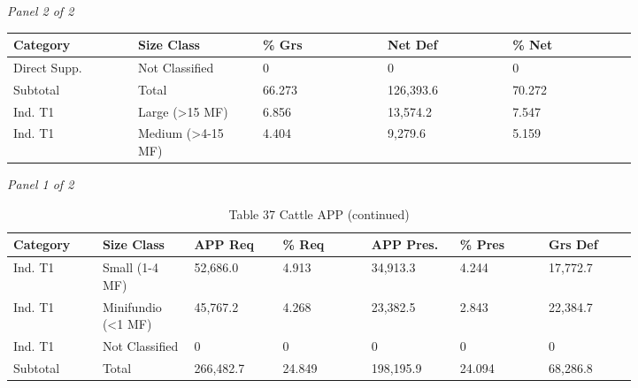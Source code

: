 \documentclass[12pt]{article}
\begin{document}
\begin{landscape}
\begin{table}[H]
\textit{Panel 2 of 2}\\[2pt]
{\fontsize{12}{14}\selectfont
\setlength{\tabcolsep}{3pt}
\renewcommand{\arraystretch}{1.08}
\begin{tabular}{p{0.164\linewidth}p{0.164\linewidth}p{0.164\linewidth}p{0.164\linewidth}p{0.164\linewidth}}
\toprule
Category & Size Class & \% Grs & Net Def & \% Net \\
\midrule
Direct Supp. & Not Classified & 0 & 0 & 0 \\
Subtotal & Total & 66.273 & 126,393.6 & 70.272 \\
Ind. T1 & Large (>15 MF) & 6.856 & 13,574.2 & 7.547 \\
Ind. T1 & Medium (>4-15 MF) & 4.404 & 9,279.6 & 5.159 \\
\bottomrule
\end{tabular}
}
\end{table}
\begin{table}[H]
\centering
\caption{Table 37 Cattle APP (continued)}
\textit{Panel 1 of 2}\\[2pt]
{\fontsize{12}{14}\selectfont
\setlength{\tabcolsep}{3pt}
\renewcommand{\arraystretch}{1.08}
\begin{tabular}{p{0.117\linewidth}p{0.117\linewidth}p{0.117\linewidth}p{0.117\linewidth}p{0.117\linewidth}p{0.117\linewidth}p{0.117\linewidth}}
\toprule
Category & Size Class & APP Req & \% Req & APP Pres. & \% Pres & Grs Def \\
\midrule
Ind. T1 & Small (1-4 MF) & 52,686.0 & 4.913 & 34,913.3 & 4.244 & 17,772.7 \\
Ind. T1 & Minifundio (<1 MF) & 45,767.2 & 4.268 & 23,382.5 & 2.843 & 22,384.7 \\
Ind. T1 & Not Classified & 0 & 0 & 0 & 0 & 0 \\
Subtotal & Total & 266,482.7 & 24.849 & 198,195.9 & 24.094 & 68,286.8 \\
\bottomrule
\end{tabular}
}

\vspace{0.6em}


\end{table}
\end{landscape}
\end{document}
